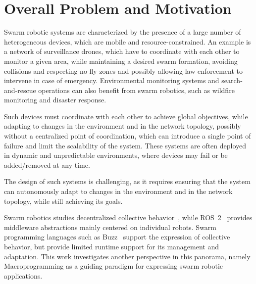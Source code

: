 \documentclass[conference]{IEEEtran}
\begin{document}
\section{Overall Problem and Motivation}\label{sec:overall-problem-and-motivation}
Swarm robotic systems are characterized by the presence of a large number of heterogeneous devices,
which are mobile and resource-constrained.
%
An example is a network of surveillance drones,
which have to coordinate with each other to monitor a given area,
while maintaining a desired swarm formation, avoiding collisions and respecting no-fly zones
and possibly allowing law enforcement to intervene in case of emergency.
%
Environmental monitoring systems and search-and-rescue operations can also benefit from swarm robotics,
such as wildfire monitoring and disaster response.

Such devices must coordinate with each other to achieve global objectives,
while adapting to changes in the environment and in the network topology,
possibly without a centralized point of coordination,
which can introduce a single point of failure and limit the scalability of the system.
%
These systems are often deployed in dynamic and unpredictable environments,
where devices may fail or be added/removed at any time.

The design of such systems is challenging,
as it requires ensuring that the system can autonomously adapt to changes in the environment and in the network topology,
while still achieving its goals.

Swarm robotics studies decentralized collective behavior~\cite{brambilla2013swarm},
while ROS~2~\cite{ros} provides middleware abstractions mainly centered on individual robots.
%
Swarm programming languages such as Buzz~\cite{DBLP:journals/software/PinciroliB16} support the expression of collective behavior,
but provide limited runtime support for its management and adaptation.
%
This work investigates another perspective in this panorama,
namely Macroprogramming as a guiding paradigm for expressing swarm robotic applications.
\end{document}
